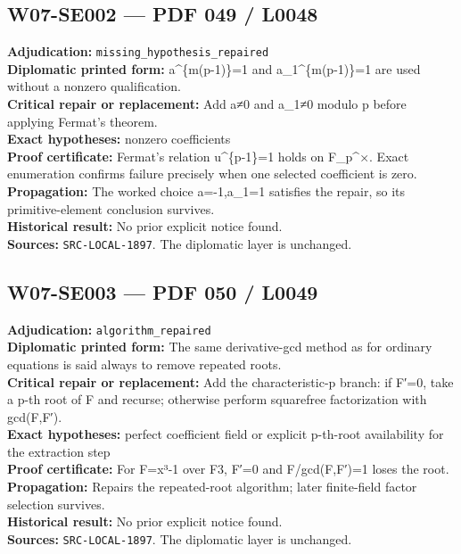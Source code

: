 \documentclass[
  10pt,
  a4paper,
]{scrreprt}
\begin{document}
\subsection{W07-SE002 --- PDF 049 /
L0048}\label{w07-se002-pdf-049-l0048}

\textbf{Adjudication:} \texttt{missing\_hypothesis\_repaired}\\
\textbf{Diplomatic printed form:} a\^{}\{m(p-1)\}=1 and
a\_1\^{}\{m(p-1)\}=1 are used without a nonzero qualification.\\
\textbf{Critical repair or replacement:} Add a≠0 and a\_1≠0 modulo p
before applying Fermat's theorem.\\
\textbf{Exact hypotheses:} nonzero coefficients\\
\textbf{Proof certificate:} Fermat's relation u\^{}\{p-1\}=1 holds on
F\_p\^{}×. Exact enumeration confirms failure precisely when one
selected coefficient is zero.\\
\textbf{Propagation:} The worked choice a=-1,a\_1=1 satisfies the
repair, so its primitive-element conclusion survives.\\
\textbf{Historical result:} No prior explicit notice found.\\
\textbf{Sources:} \texttt{SRC-LOCAL-1897}. The diplomatic layer is
unchanged.

\subsection{W07-SE003 --- PDF 050 /
L0049}\label{w07-se003-pdf-050-l0049}

\textbf{Adjudication:} \texttt{algorithm\_repaired}\\
\textbf{Diplomatic printed form:} The same derivative-gcd method as for
ordinary equations is said always to remove repeated roots.\\
\textbf{Critical repair or replacement:} Add the characteristic-p
branch: if F′=0, take a p-th root of F and recurse; otherwise perform
squarefree factorization with gcd(F,F′).\\
\textbf{Exact hypotheses:} perfect coefficient field or explicit
p-th-root availability for the extraction step\\
\textbf{Proof certificate:} For F=x³-1 over F3, F′=0 and F/gcd(F,F′)=1
loses the root.\\
\textbf{Propagation:} Repairs the repeated-root algorithm; later
finite-field factor selection survives.\\
\textbf{Historical result:} No prior explicit notice found.\\
\textbf{Sources:} \texttt{SRC-LOCAL-1897}. The diplomatic layer is
unchanged.
\end{document}
